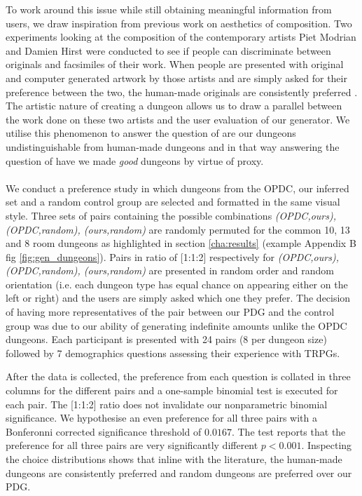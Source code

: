 \documentclass{UoYCSproject}
\begin{document}
To work around this issue while still obtaining meaningful information from users, we draw inspiration from previous work on aesthetics of composition. Two experiments looking at the composition of the contemporary artists Piet Modrian and Damien Hirst were conducted to see if people can discriminate between originals and facsimiles of their work. When people are presented with original and computer generated artwork by those artists and are simply asked for their preference between the two, the human-made originals are consistently preferred \parencite{McManusMondrian, FurnhamMondrian}. The artistic nature of creating a dungeon allows us to draw a parallel between the work done on these two artists and the user evaluation of our generator. We utilise this phenomenon to answer the question of are our dungeons undistinguishable from human-made dungeons and in that way answering the question of have we made \textit{good} dungeons by virtue of proxy.

\paragraph{}
We conduct a preference study in which dungeons from the OPDC, our inferred set and a random control group are selected and formatted in the same visual style. Three sets of pairs containing the possible combinations \textit{(OPDC,ours), (OPDC,random), (ours,random)} are randomly permuted for the common 10, 13 and 8 room dungeons as highlighted in section \ref{cha:results} (example Appendix B fig \ref{fig:gen_dungeons}). Pairs in ratio of [1:1:2] respectively for \textit{(OPDC,ours), (OPDC,random), (ours,random)} are presented in random order and random orientation (i.e. each dungeon type has equal chance on appearing either on the left or right) and the users are simply asked which one they prefer. The decision of having more representatives of the pair between our PDG and the control group was due to our ability of generating indefinite amounts unlike the OPDC dungeons. Each participant is presented with 24 pairs (8 per dungeon size) followed by 7 demographics questions assessing their experience with TRPGs. 

After the data is collected, the preference from each question is collated in three columns for the different pairs and a one-sample binomial test is executed for each pair. The [1:1:2] ratio does not invalidate our nonparametric binomial significance. We hypothesise an even preference for all three pairs with a Bonferonni corrected significance threshold of \(0.0167\). The test reports that the preference for all three pairs are very significantly different \(p < 0.001\). Inspecting the choice distributions shows that inline with the literature, the human-made dungeons are consistently preferred and random dungeons are preferred over our PDG.
\end{document}

